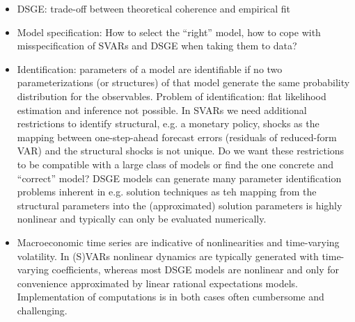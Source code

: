 \documentclass[a4paper]{scrartcl}
\newif\ifpartTSA   %
\begin{document}
\begin{solution}
\begin{itemize}
\begin{itemize}
	\item DSGE: trade-off between theoretical coherence and empirical fit
	\item Model specification: How to select the \enquote{right} model, how to cope with misspecification of SVARs and DSGE when taking them to data?
	\item Identification: parameters of a model are identifiable if no two parameterizations (or structures) of that model generate the same probability distribution for the observables. Problem of identification: flat likelihood estimation and inference not possible. In SVARs we need additional restrictions to identify structural, e.g. a monetary policy, shocks as the mapping between one-step-ahead forecast errors (residuals of reduced-form VAR) and the structural shocks is not unique. Do we want these restrictions to be compatible with a large class of models or find the one concrete and \enquote{correct} model? DSGE models can generate many parameter identification problems inherent in e.g. solution techniques as teh mapping from the structural parameters into the (approximated) solution parameters is highly nonlinear and typically can only be evaluated numerically.
	\item Macroeconomic time series are indicative of nonlinearities and time-varying volatility. In (S)VARs nonlinear dynamics are typically generated with time-varying coefficients, whereas most DSGE models are nonlinear and only for convenience approximated by linear rational expectations models. Implementation of computations is in both cases often cumbersome and challenging.
\end{itemize}

\end{itemize}
\newpage %
\end{solution}
\newpage
\fi  %

\ifpartTSA  %
\end{document}
